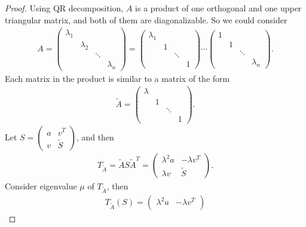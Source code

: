 \documentclass[10pt]{book}
\theoremstyle{definition}
\numberwithin{equation}{chapter}
\begin{document}
\begin{proof}
Using QR decomposition, $A$ is a product of one orthogonal and one upper triangular matrix, and both of them are diagonalizable. So we could consider
\begin{align*}
    A = \begin{pmatrix}
        \lambda_1 & & & \\
        & \lambda_2 & & \\
        & & \ddots & \\
        & & & \lambda_n
    \end{pmatrix} = \begin{pmatrix}
        \lambda_1 & & & \\
        & 1 & & \\
        & & \ddots & \\
        & & & 1
    \end{pmatrix} \cdots \begin{pmatrix}
        1 & & & \\
        & 1 & & \\
        & & \ddots & \\
        & & & \lambda_n
    \end{pmatrix}.
\end{align*}
Each matrix in the product is similar to a matrix of the form
\begin{align*}
    \widetilde{A} = \begin{pmatrix}
        \lambda & & & \\
        & 1 & & \\
        & & \ddots & \\
        & & & 1
    \end{pmatrix}.
\end{align*}
Let $S = \begin{pmatrix}
    a & v^T \\
    v & \widetilde{S} 
\end{pmatrix}$, and then
\begin{align*}
    T_{\widetilde{A}} = \widetilde{A} S \widetilde{A}^T = \begin{pmatrix}
        \lambda^2 a & -\lambda v^T \\
        \lambda v & \widetilde{S} 
    \end{pmatrix}.
\end{align*}
Consider eigenvalue $\mu$ of $T_{\widetilde{A}}$, then
\begin{align*}
    T_{\widetilde{A}}(S) = \begin{pmatrix}
        \lambda^2 a & -\lambda v^T \\

\end{pmatrix}
\end{align*}
\end{proof}
\end{document}
